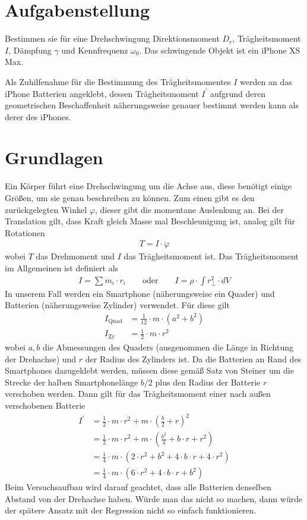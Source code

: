 \documentclass{article}
\begin{document}
\newpage

\section{Aufgabenstellung}
Bestimmen sie für eine Drehschwingung Direktionsmoment $D_r$, Trägheitsmoment $I$, Dämpfung $\gamma$ und Kennfrequenz $\omega_0$. Das schwingende Objekt ist ein iPhone XS Max. 

Als Zuhilfenahme für die Bestimmung des Trägheitsmomentes $I$ werden an das iPhone Batterien angeklebt, dessen Trägheitsmoment $I^\prime$ aufgrund deren geometrischen Beschaffenheit näherungsweise genauer bestimmt werden kann als derer des iPhones.


\section{Grundlagen}
Ein Körper führt eine Drehschwingung um die Achse aus, diese benötigt einige Größen, um sie genau beschreiben zu können. Zum einen gibt es den zurückgelegten Winkel $\varphi$, dieser gibt die momentane Auslenkung an. Bei der Translation gilt, dass Kraft gleich Masse mal Beschleunigung ist, analog gilt für Rotationen
\begin{align}
T = I \cdot \ddot{\varphi}
\end{align}
wobei $T$ das Drehmoment und $I$ das Trägheitsmoment ist.
Das Trägheitsmoment im Allgemeinen ist definiert als
\begin{align}
I = \sum m_i \cdot r_i \qquad \text{oder} \qquad I = \rho \cdot \int r_{\perp}^2 \cdot dV
\end{align}
In unserem Fall werden ein Smartphone (näherungsweise ein Quader) und Batterien (näherungsweise Zylinder) verwendet. Für diese gilt
\begin{align}
I_{\text{Quad}} &= \frac{1}{12}\cdot m \cdot (a^2 + b^2) \\
I_{\text{Zy}} &= \frac{1}{2} \cdot m \cdot r^2
\end{align}
wobei $a,b$ die Abmessungen des Quaders (ausgenommen die Länge in Richtung der Drehachse) und $r$ der Radius des Zylinders ist. Da die Batterien an Rand des Smartphones dazugeklebt werden, müssen diese gemäß Satz von Steiner um die Strecke der halben Smartphonelänge $b/2$ plus den Radius der Batterie $r$ verschoben werden. Dann gilt für das Trägheitsmoment einer nach außen verschobenen Batterie
\begin{align}
I^\prime &= \frac{1}{2}\cdot m\cdot r^2 + m \cdot \left(\frac{b}{2} + r\right)^2 \\
&= \frac{1}{2}\cdot m \cdot r^2 + m\cdot\left(\frac{b^2}{4} + b\cdot r + r^2\right)  \\
&= \frac{1}{4}\cdot m\cdot \left( 2\cdot r^2 + b^2 + 4\cdot b \cdot r + 4\cdot r^2\right) \\
&= \frac{1}{4} \cdot m \cdot \left( 6\cdot r^2 + 4\cdot b \cdot r + b^2\right)
\end{align}
Beim Versuchsaufbau wird darauf geachtet, dass alle Batterien denselben Abstand von der Drehachse haben. Würde man das nicht so machen, dann würde der spätere Ansatz mit der Regression nicht so einfach funktionieren.
\end{document}
